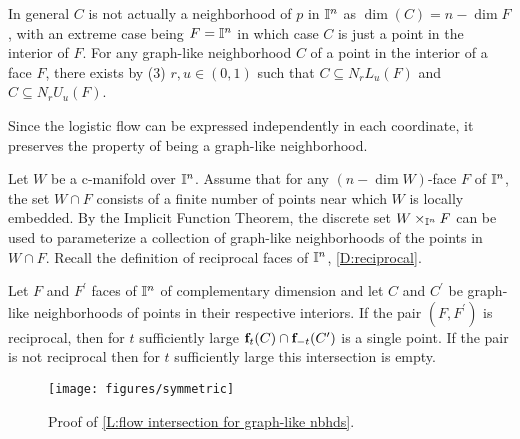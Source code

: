 In general $C$ is not actually a neighborhood of $p$ in $\mathbb{I}^n$ as $\dim(C)=n-\dim F$, with an extreme case being $F =\mathbb{I}^n$ in which case $C$ is just a point in the interior of $F$.
For any graph-like neighborhood $C$ of a point in the interior of a face $F$, there exists by (3) $r, u \in (0,1)$ such that $C \subseteq N_rL_u(F)$ and $C \subseteq N_rU_u(F)$.

Since the logistic flow can be expressed independently in each coordinate, it preserves the property of being a graph-like neighborhood.

Let $W$ be a c-manifold over $\mathbb{I}^n$.
Assume that for any $(n-\dim W)$-face $F$ of $\mathbb{I}^n$, the set $W \cap F$ consists of a finite number of points near which $W$ is locally embedded.
By the Implicit Function Theorem, the discrete set $W \times_{\mathbb{I}^n} F$ can be used to parameterize a collection of graph-like neighborhoods of the points in $W \cap F$.
Recall the definition of reciprocal faces of $\mathbb{I}^n$, \cref{D:reciprocal}.

\begin{lemma}\label{L:flow intersection for graph-like nbhds}
	Let $F$ and $F^\prime$ faces of $\mathbb{I}^n$ of complementary dimension and let $C$ and $C^\prime$ be graph-like neighborhoods of points in their respective interiors.
	If the pair $(F,F^\prime)$ is reciprocal, then for $t$ sufficiently large $\mathbf{f}_t(C) \cap \mathbf{f}_{-t}(C^\prime)$ is a single point.
	If the pair is not reciprocal then for $t$ sufficiently large this intersection is empty.
\end{lemma}

\begin{figure}[!h]
	\texttt{[image: figures/symmetric]}
	\caption{Proof of \cref{L:flow intersection for graph-like nbhds}.}
	\label{F: intersection}
\end{figure}


